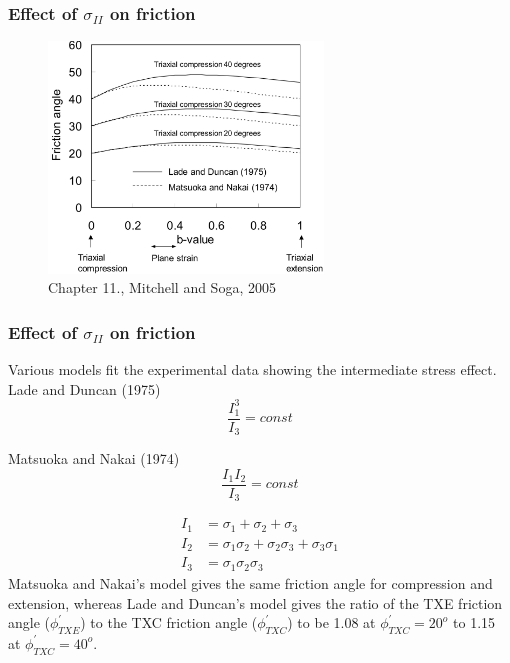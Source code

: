 \documentclass[notes]{beamer}
\begin{document}
\begin{frame}
\frametitle{Effect of $\sigma_{II}$ on friction}
\begin{figure}
	\includegraphics[width=0.65\textwidth]{figs/friction-bvalue.png}
	\caption*{Chapter 11., Mitchell and Soga, 2005}
\end{figure}
\end{frame}


\begin{frame}
\frametitle{Effect of $\sigma_{II}$ on friction}
	Various models fit the experimental data showing the intermediate stress effect.
	Lade and Duncan (1975)
	\begin{equation*}
		\frac{I_1^3}{I_3} = const
	\end{equation*}
	
	Matsuoka and Nakai (1974)
	\begin{equation*}
		\frac{I_1 I_2}{I_3} = const
	\end{equation*}
	
	\begin{align*}
		I_1 &= \sigma_1 + \sigma_2 + \sigma_3 \\
		I_2 &= \sigma_1\sigma_2 + \sigma_2 \sigma_3 + \sigma_3 \sigma_1\\
		I_3 &= \sigma_1\sigma_2\sigma_3
	\end{align*}
Matsuoka and Nakai's model gives the same friction angle for compression and extension, whereas Lade and Duncan's model gives the ratio of the TXE friction angle ($\phi_{TXE}^\prime$) to the TXC friction angle ($\phi_{TXC}^\prime$) to be 1.08 at $\phi_{TXC}^\prime = 20^o$ to 1.15 at $\phi_{TXC}^\prime = 40^o$. 
\end{frame}
\end{document}
